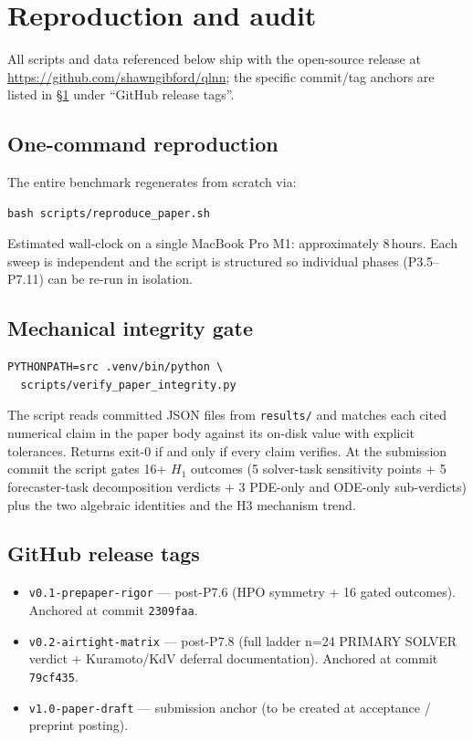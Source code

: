\documentclass[%
  prx,
  amsmath,
  amssymb,
  aps,
  reprint,
  superscriptaddress,
  floatfix,
]{revtex4-2}
\begin{document}
\section{Reproduction and audit}
\label{sup:repro}

All scripts and data referenced below ship with the open-source
release at \url{https://github.com/shawngibford/qlnn}; the
specific commit/tag anchors are listed in \S\ref{sup:repro}
under ``GitHub release tags''.

\subsection{One-command reproduction}

The entire benchmark regenerates from scratch via:
\begin{verbatim}
bash scripts/reproduce_paper.sh
\end{verbatim}
Estimated wall-clock on a single MacBook Pro M1: approximately
8\,hours. Each sweep is independent and the script is structured
so individual phases (P3.5--P7.11) can be re-run in isolation.

\subsection{Mechanical integrity gate}

\begin{verbatim}
PYTHONPATH=src .venv/bin/python \
  scripts/verify_paper_integrity.py
\end{verbatim}
The script reads committed JSON files from \texttt{results/} and
matches each cited numerical claim in the paper body against its
on-disk value with explicit tolerances. Returns exit-0 if and only
if every claim verifies. At the submission commit the script gates
16+ $H_1$ outcomes (5 solver-task sensitivity points + 5
forecaster-task decomposition verdicts + 3 PDE-only and
ODE-only sub-verdicts) plus the two algebraic identities and the
H3 mechanism trend.

\subsection{GitHub release tags}

\begin{itemize}
  \item \texttt{v0.1-prepaper-rigor} — post-P7.6 (HPO symmetry + 16
        gated outcomes). Anchored at commit \texttt{2309faa}.
  \item \texttt{v0.2-airtight-matrix} — post-P7.8 (full ladder
        n=24 PRIMARY SOLVER verdict + Kuramoto/KdV deferral
        documentation). Anchored at commit \texttt{79cf435}.
  \item \texttt{v1.0-paper-draft} — submission anchor (to be
        created at acceptance / preprint posting).
\end{itemize}
\end{document}
